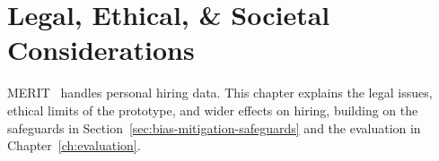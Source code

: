 \chapter{Legal, Ethical, \& Societal Considerations}

MERIT~\cite{merit_repo} handles personal hiring data.
This chapter explains the legal issues, ethical limits of the
prototype, and wider effects on hiring, building on the safeguards
in Section~\ref{sec:bias-mitigation-safeguards} and the evaluation
in Chapter~\ref{ch:evaluation}.




